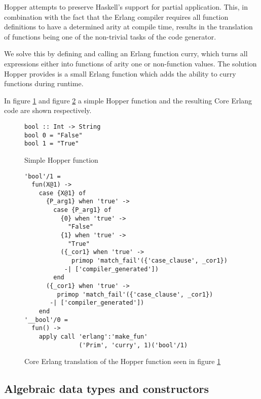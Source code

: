 Hopper attempts to preserve Haskell's support for partial application. This, in combination with the fact that the Erlang compiler requires all function definitions to have a determined arity at compile time, results in the translation of functions being one of the non-trivial tasks of the code generator.

We solve this by defining and calling an Erlang function curry, which turns all expressions either into functions of arity one or non-function values. The solution Hopper provides is a small Erlang function which adds the ability to curry functions during runtime. 

In figure \ref{lst:hopperFun} and figure \ref{lst:coreFun} a simple Hopper function and the resulting Core Erlang code are shown respectively.

\begin{figure}[!htb]
\centering
\begin{minipage}[b]{0.38\linewidth}
\centering
\begin{lstlisting}
bool :: Int -> String
bool 0 = "False"
bool 1 = "True"
\end{lstlisting}
\end{minipage}
\caption{Simple Hopper function}
\label{lst:hopperFun}
\end{figure}

\begin{figure}[!htb]
\centering
\begin{lstlisting}
'bool'/1 =
  fun(X@1) ->
    case {X@1} of
      {P_arg1} when 'true' ->
        case {P_arg1} of
          {0} when 'true' ->
            "False"
          {1} when 'true' ->
            "True"
          ({_cor1} when 'true' ->
             primop 'match_fail'({'case_clause', _cor1})
           -| ['compiler_generated'])
        end
      ({_cor1} when 'true' ->
         primop 'match_fail'({'case_clause', _cor1})
       -| ['compiler_generated'])
    end
'__bool'/0 =
  fun() ->
    apply call 'erlang':'make_fun'
               ('Prim', 'curry', 1)('bool'/1)
\end{lstlisting}
\caption[Generated Core Erlang translation of function]
 {Core Erlang translation of the Hopper function seen in figure \ref{lst:hopperFun}}
\label{lst:coreFun}
\end{figure}

\subsection{Algebraic data types and constructors}

